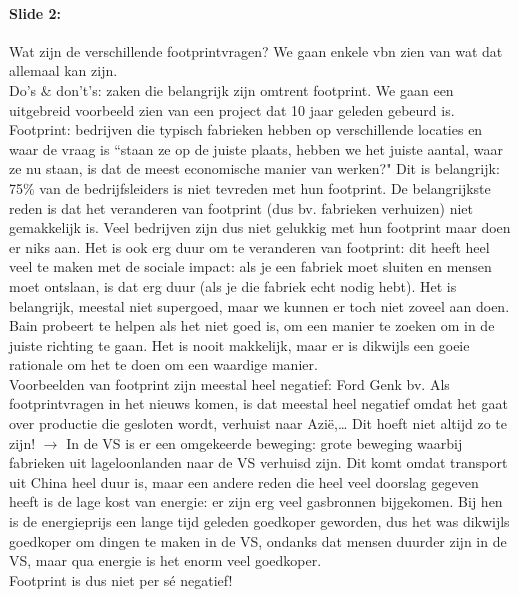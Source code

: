 \documentclass[10pt,a4paper]{report}
\begin{document}
\paragraph{Slide 2:} Wat zijn de verschillende footprintvragen? We gaan enkele vbn zien van wat dat allemaal kan zijn.\\
Do's $\&$ don't's: zaken die belangrijk zijn omtrent footprint. 
We gaan een uitgebreid voorbeeld zien van een project dat 10 jaar geleden gebeurd is.\\
Footprint: bedrijven die typisch fabrieken hebben op verschillende locaties en waar de vraag is ``staan ze op de juiste plaats, hebben we het juiste aantal, waar ze nu staan, is dat de meest economische manier van werken?" Dit is belangrijk: 75\% van de bedrijfsleiders is niet tevreden met hun footprint. De belangrijkste reden is dat het veranderen van footprint (dus bv. fabrieken verhuizen) niet gemakkelijk is. Veel bedrijven zijn dus niet gelukkig met hun footprint maar doen er niks aan. Het is ook erg duur om te veranderen van footprint: dit heeft heel veel te maken met de sociale impact: als je een fabriek moet sluiten en mensen moet ontslaan, is dat erg duur (als je die fabriek echt nodig hebt). Het is belangrijk, meestal niet supergoed, maar we kunnen er toch niet zoveel aan doen.\\
Bain probeert te helpen als het niet goed is, om een manier te zoeken om in de juiste richting te gaan. Het is nooit makkelijk, maar er is dikwijls een goeie rationale om het te doen om een waardige manier.\\
Voorbeelden van footprint zijn meestal heel negatief: Ford Genk bv. Als footprintvragen in het nieuws komen, is dat meestal heel negatief omdat het gaat over productie die gesloten wordt, verhuist naar Azi\"e,… Dit hoeft niet altijd zo te zijn! $\rightarrow$ In de VS is er een omgekeerde beweging: grote beweging waarbij fabrieken uit lageloonlanden naar de VS verhuisd zijn. Dit komt omdat transport uit China heel duur is, maar een andere reden die heel veel doorslag gegeven heeft is de lage kost van energie: er zijn erg veel gasbronnen bijgekomen. Bij hen is de energieprijs een lange tijd geleden goedkoper geworden, dus het was dikwijls goedkoper om dingen te maken in de VS, ondanks dat mensen duurder zijn in de VS, maar qua energie is het enorm veel goedkoper.\\
Footprint is dus niet per s\'e negatief!
\end{document}
